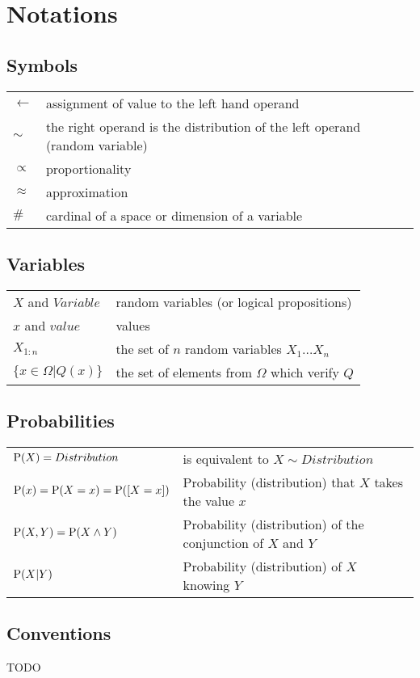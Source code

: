 \chapter*{Notations}

\section*{Symbols}
\begin{tabular}{ll}
$\leftarrow$ & assignment of value to the left hand operand \\
$\sim$ & the right operand is the distribution of the left operand (random variable) \\
$\propto$ & proportionality \\
$\approx$ & approximation \\
$\#$ & cardinal of a space or dimension of a variable \\
\end{tabular}

\section*{Variables}
\begin{tabular}{ll}
$X$ and $Variable$ & random variables (or logical propositions) \\
$x$ and $value$ & values \\
$X_{1:n}$ & the set of $n$ random variables $X_1 \dots X_n$ \\
$\{x \in \Omega | Q(x)\}$ & the set of elements from $\Omega$ which verify $Q$ \\
\end{tabular}

\section*{Probabilities}

\begin{tabular}{ll}
$\mathrm{P}(X) = Distribution$ & is equivalent to $X \sim Distribution$\\
$\mathrm{P}(x) = \mathrm{P}(X=x) = \mathrm{P}([X=x])$ & Probability (distribution) that $X$ takes the value $x$ \\
$\mathrm{P}(X,Y) = \mathrm{P}(X\wedge Y)$ & Probability (distribution) of the conjunction of $X$ and $Y$ \\
$\mathrm{P}(X|Y)$ & Probability (distribution) of $X$ knowing $Y$ \\
\end{tabular}

\section*{Conventions}
TODO
